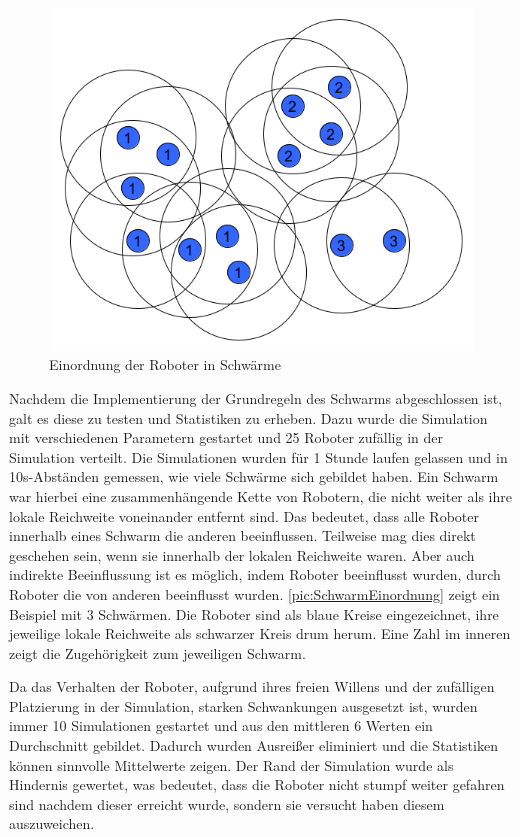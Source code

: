 \begin{figure}
	\includegraphics[width=\pictureWidthBig,keepaspectratio]{graphics/SchwarmEinordnung.png}
	\caption{Einordnung der Roboter in Schwärme}
	\label{pic:SchwarmEinordnung}
\end{figure}

Nachdem die Implementierung der Grundregeln des Schwarms abgeschlossen ist, galt es diese zu testen und Statistiken zu erheben. Dazu wurde die Simulation mit verschiedenen Parametern gestartet und 25 Roboter zufällig in der Simulation verteilt. Die Simulationen wurden für 1 Stunde laufen gelassen und in 10s-Abständen gemessen, wie viele Schwärme sich gebildet haben.
Ein Schwarm war hierbei eine zusammenhängende Kette von Robotern, die nicht weiter als ihre lokale Reichweite voneinander entfernt sind. Das bedeutet, dass alle Roboter innerhalb eines Schwarm die anderen beeinflussen. Teilweise mag dies direkt geschehen sein, wenn sie innerhalb der lokalen Reichweite waren. Aber auch indirekte Beeinflussung ist es möglich, indem Roboter beeinflusst wurden, durch Roboter die von anderen beeinflusst wurden. \autoref{pic:SchwarmEinordnung} zeigt ein Beispiel mit 3 Schwärmen. Die Roboter sind als blaue Kreise eingezeichnet, ihre jeweilige lokale Reichweite als schwarzer Kreis drum herum. Eine Zahl im inneren zeigt die Zugehörigkeit zum jeweiligen Schwarm.

Da das Verhalten der Roboter, aufgrund ihres freien Willens und der zufälligen Platzierung in der Simulation, starken Schwankungen ausgesetzt ist, wurden immer 10 Simulationen gestartet und aus den mittleren 6 Werten ein Durchschnitt gebildet. Dadurch wurden Ausreißer eliminiert und die Statistiken können sinnvolle Mittelwerte zeigen. Der Rand der Simulation wurde als Hindernis gewertet, was bedeutet, dass die Roboter nicht stumpf weiter gefahren sind nachdem dieser erreicht wurde, sondern sie versucht haben diesem auszuweichen.

